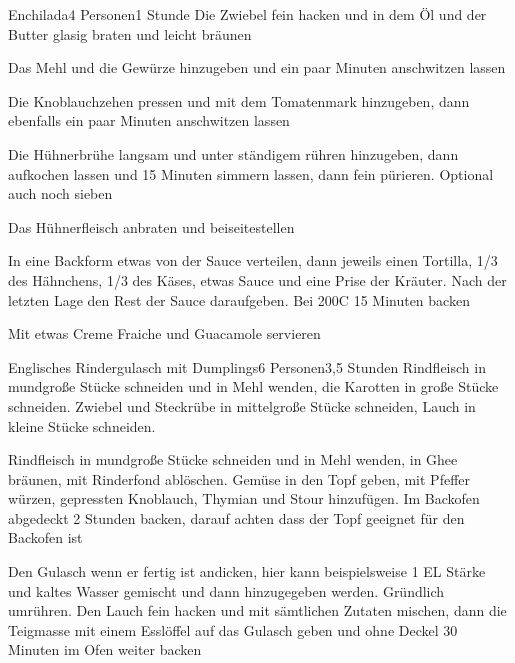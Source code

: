 \begin{recipe}{Enchilada}{4 Personen}{1 Stunde}
Die Zwiebel fein hacken und in dem Öl und der Butter glasig braten und leicht bräunen

Das Mehl und die Gewürze hinzugeben und ein paar Minuten anschwitzen lassen

Die Knoblauchzehen pressen und mit dem Tomatenmark hinzugeben, dann ebenfalls ein paar Minuten anschwitzen lassen

Die Hühnerbrühe langsam und unter ständigem rühren hinzugeben, dann aufkochen lassen und 15 Minuten simmern lassen, dann fein pürieren. Optional auch noch sieben

Das Hühnerfleisch anbraten und beiseitestellen

In eine Backform etwas von der Sauce verteilen, dann jeweils einen Tortilla, 1/3 des Hähnchens,  1/3 des Käses, etwas Sauce und eine Prise der Kräuter. Nach der letzten Lage den Rest der Sauce daraufgeben. Bei 200\0C 15 Minuten backen

Mit etwas Creme Fraiche und Guacamole servieren
\end{recipe}


\begin{recipe}{Englisches Rindergulasch mit Dumplings}{6 Personen}{3,5 Stunden}
Rindfleisch in mundgroße Stücke schneiden und in Mehl wenden, die Karotten in große Stücke schneiden. Zwiebel und Steckrübe in mittelgroße Stücke schneiden, Lauch in kleine Stücke schneiden.

Rindfleisch in mundgroße Stücke schneiden und in Mehl wenden, in Ghee bräunen,  mit Rinderfond ablöschen.
Gemüse in den Topf geben, mit Pfeffer würzen, gepressten Knoblauch, Thymian und Stour hinzufügen. Im Backofen abgedeckt 2 Stunden backen, darauf achten dass der Topf geeignet für den Backofen ist

Den Gulasch wenn er fertig ist andicken, hier kann beispielsweise 1 EL Stärke und kaltes Wasser gemischt und dann hinzugegeben werden. Gründlich umrühren.
Den Lauch fein hacken und mit sämtlichen Zutaten mischen, dann die Teigmasse mit einem Esslöffel auf das Gulasch geben und ohne Deckel 30 Minuten im Ofen weiter backen
\end{recipe}

